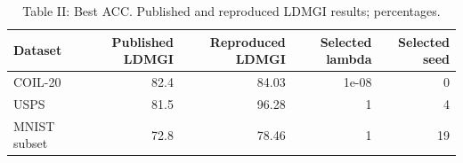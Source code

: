 \begin{table}[ht]
\centering
\caption{Table II: Best ACC. Published and reproduced LDMGI results; percentages.}
\begin{tabular}{lrrrr}
\toprule
Dataset & Published LDMGI & Reproduced LDMGI & Selected lambda & Selected seed \\
\midrule
COIL-20 & 82.4 & 84.03 & 1e-08 & 0 \\
USPS & 81.5 & 96.28 & 1 & 4 \\
MNIST subset & 72.8 & 78.46 & 1 & 19 \\
\bottomrule
\end{tabular}
\end{table}
